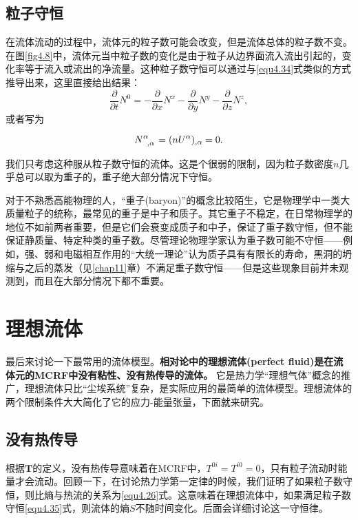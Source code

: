 \subsection*{粒子守恒}
在流体流动的过程中，流体元的粒子数可能会改变，但是流体总体的粒子数不变。在图\ref{fig4.8}中，流体元当中粒子数的变化是由于粒子从边界面流入流出引起的，变化率等于流入或流出的净流量。这种粒子数守恒可以通过与\eqref{equ4.34}式类似的方式推导出来，这里直接给出结果：
\[
    \frac{\partial}{\partial t} N^0 = -\frac{\partial}{\partial x} N^x - \frac{\partial}{\partial y} N^y - \frac{\partial}{\partial z} N^z,
\]
或者写为
\begin{shaded}
\begin{equation}
    N\indices{^\alpha_{, \alpha}}  = (n U^\alpha)_{, \alpha} = 0.
\label{equ4.35}
\end{equation}
\end{shaded}
我们只考虑这种服从粒子数守恒的流体。这是个很弱的限制，因为粒子数密度$n$几乎总可以取为重子的，重子绝大部分情况下守恒。

对于不熟悉高能物理的人，“重子(baryon)”的概念比较陌生，它是物理学中一类大质量粒子的统称，最常见的重子是中子和质子。其它重子不稳定，在日常物理学的地位不如前两者重要，但是它们会衰变成质子和中子，保证了重子数守恒，但不能保证静质量、特定种类的重子数。尽管理论物理学家认为重子数可能不守恒——例如，强、弱和电磁相互作用的“大统一理论”认为质子具有有限长的寿命，黑洞的坍缩与之后的蒸发（见\ref{chap11}章）不满足重子数守恒——但是这些现象目前并未观测到，而且在大部分情况下都不重要。


\section{理想流体}
\label{sec4.6}
最后来讨论一下最常用的流体模型。\textbf{相对论中的理想流体(perfect fluid)是在流体元的MCRF中没有粘性、没有热传导的流体。} 它是热力学“理想气体”概念的推广，理想流体只比“尘埃系统”复杂，是实际应用的最简单的流体模型。理想流体的两个限制条件大大简化了它的应力-能量张量，下面就来研究。

\subsection*{没有热传导}
根据$\mathbf{T}$的定义，没有热传导意味着在MCRF中，$T^{0i} = T^{i0} = 0$，只有粒子流动时能量才会流动。回顾一下，在讨论热力学第一定律的时候，我们证明了如果粒子数守恒，则比熵与热流的关系为\eqref{equ4.26}式。这意味着在理想流体中，如果满足粒子数守恒\eqref{equ4.35}式，则流体的熵$S$不随时间变化。后面会详细讨论这一守恒律。



